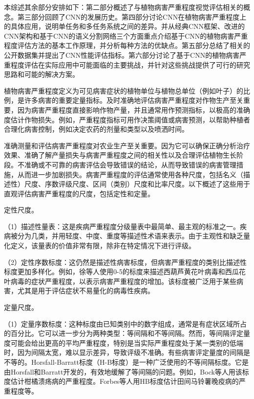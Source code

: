 本综述其余部分安排如下：第二部分概述了与植物病害严重程度视觉评估相关的概念。第三部分回顾了CNN的发展历史。第四部分讨论CNN在植物病害严重程度上的具体应用，说明单任务和多任务系统之间的差异。并从经典CNN框架、改进的CNN架构和基于CNN的语义分割网络三个方面重点介绍基于CNN的植物病害严重程度评估方法的基本工作原理，并分析每种方法的优缺点。第五部分总结了相关的公开数据集并提出了CNN性能评估指标。第六部分讨论了基于CNN的植物病害严重程度评估在实际应用中可能面临的主要挑战，并针对这些挑战提供了可行的研究思路和可能的解决方案。

植物病害严重程度定义为可见病害症状的植物单位与植物总单位（例如叶子）的比例，是许多病害的重要定量指标。及时准确地评估病害严重程度对作物生产至关重要，因为病害严重程度直接影响作物产量，并且通常用作预测指标，以极高的准确度估计作物损失。例如，严重程度指标可用作决策阈值或病害预测，以帮助种植者合理化病害控制，例如决定农药的剂量和类型以及喷洒时间。

准确测量和评估病害严重程度对农业生产至关重要。因为它可以确保正确分析治疗效果、准确了解产量损失与病害严重程度之间的相关性以及合理评估植物生长阶段。不准确或不可靠的病害评估会导致错误的结论，从而导致错误的病害管理措施，从而进一步加剧损失。病害严重程度的评估通常使用各种尺度，包括名义（描述性）尺度、序数评级尺度、区间（类别）尺度和比率尺度。以下概述了这些用于直观评估病害严重程度的尺度，包括定性和定量。

定性尺度。

（1）描述性量表：这是疾病严重程度分级量表中最简单、最主观的标准之一。疾病被分为几类，并用轻度、中度、重度等描述性术语来表示。由于主观性和缺乏量化定义，该量表的价值非常有限，除非在特定情况下进行评级。

（2）定性序数标度：这仍然是描述性病害标度，但病害严重程度的类别比描述性标度更加多样化。例如，徐等人使用0-5的标度来描述西葫芦黄花叶病毒和西瓜花叶病毒的症状严重程度，以表示病害严重程度的增加。该标度被广泛用于某些病害，尤其是用于评估症状不易量化的病毒性疾病。

定量尺度。

（1）定量序数标度：这种标度由已知类别中的数字组成，通常是有症状区域所占的百分比。它可以进一步分为两种类型：等间隔和不等间隔。然而，等间隔评定量度可能会给出更高的平均严重程度，特别是当实际严重程度处于某一类别的低端时，因为间隔太宽，难以显示差异，导致评级不准确。有些病害评定量度的间隔是不等的。Horsfall-Barratt标度（H-B标度）是一种广泛使用的不等间隔标度。它是由Horsfall和Barratt开发的，有效地缓解了等间隔的问题。例如，Bock等人用该标度估计柑橘溃疡病的严重程度。Forbes等人用HB标度估计田间马铃薯晚疫病的严重程度等。

